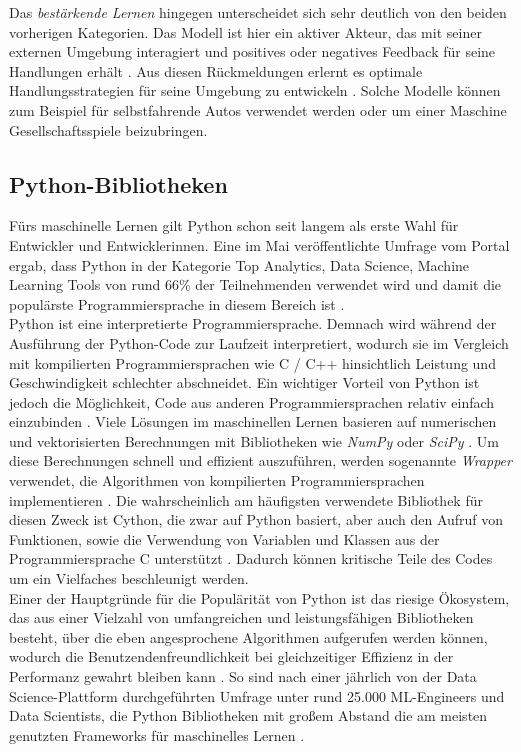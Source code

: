 \documentclass[german,bachelor]{swsLeipzig}
\begin{document}
Das \textit{bestärkende Lernen} hingegen unterscheidet sich sehr deutlich von den beiden vorherigen Kategorien.
Das Modell ist hier ein aktiver Akteur, das mit seiner externen Umgebung interagiert
und positives oder negatives Feedback für seine Handlungen erhält \cite[S. 2]{cite-key}.
Aus diesen Rückmeldungen erlernt es optimale Handlungsstrategien für seine Umgebung zu entwickeln \cite[S. 384]{mahesh2020machine}.
Solche Modelle können zum Beispiel für selbstfahrende Autos verwendet werden oder um einer Maschine Gesellschaftsspiele beizubringen.\\

\subsection{Python-Bibliotheken}
Fürs maschinelle Lernen gilt Python schon seit langem als erste Wahl für Entwickler und Entwicklerinnen.
Eine im Mai \citeyear{nugget} veröffentlichte Umfrage vom Portal \citeauthor{nugget} ergab, dass Python in der Kategorie
\glqq Top Analytics, Data Science, Machine Learning Tools\grqq{} von rund 66\% der Teilnehmenden verwendet wird
und damit die populärste Programmiersprache in diesem Bereich ist \cite{nugget}. \\

Python ist eine interpretierte Programmiersprache.
Demnach wird während der Ausführung der Python-Code zur Laufzeit interpretiert, wodurch sie im Vergleich mit kompilierten
Programmiersprachen wie C / C++ hinsichtlich Leistung und Geschwindigkeit schlechter abschneidet.
Ein wichtiger Vorteil von Python ist jedoch die Möglichkeit, Code aus anderen Programmiersprachen relativ einfach einzubinden \cite[S.977]{8757088}.
Viele Lösungen im maschinellen Lernen basieren auf numerischen und vektorisierten Berechnungen mit Bibliotheken
wie \textit{NumPy} oder \textit{SciPy} \cite[S.977]{8757088}.
Um diese Berechnungen schnell und effizient auszuführen, werden sogenannte \textit{Wrapper} verwendet,
die Algorithmen von kompilierten Programmiersprachen implementieren \cite[S.977]{8757088}.
Die wahrscheinlich am häufigsten verwendete Bibliothek für diesen Zweck ist Cython, die zwar auf Python basiert,
aber auch den Aufruf von Funktionen, sowie die Verwendung von Variablen und Klassen aus der Programmiersprache C unterstützt \cite[S.977]{8757088}.
Dadurch können kritische Teile des Codes um ein Vielfaches beschleunigt werden. \\

Einer der Hauptgründe für die Populärität von Python ist das riesige Ökosystem, das aus einer Vielzahl
von umfangreichen und leistungsfähigen Bibliotheken besteht, über die eben angesprochene Algorithmen aufgerufen werden können,
wodurch die Benutzendenfreundlichkeit bei gleichzeitiger Effizienz in der Performanz gewahrt bleiben kann \cite[S. 2]{2020}.
So sind nach einer jährlich von der Data Science-Plattform \citeauthor{kaggle} durchgeführten Umfrage unter rund 25.000 ML-Engineers
und Data Scientists, die Python Bibliotheken mit großem Abstand die am meisten genutzten Frameworks für maschinelles Lernen \cite[]{kaggle}.
\end{document}
